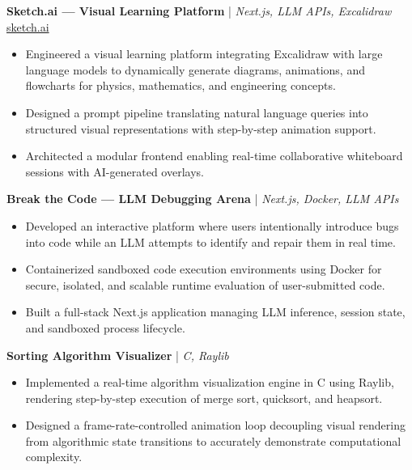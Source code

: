 \documentclass[a4paper,10pt]{article}
\begin{document}
\textbf{Sketch.ai --- Visual Learning Platform} | \textit{Next.js, LLM APIs, Excalidraw}
\quad \href{https://sketch-ai-six.vercel.app/}{sketch.ai}

\begin{itemize}
    \item Engineered a visual learning platform integrating Excalidraw with large language models to dynamically generate diagrams, animations, and flowcharts for physics, mathematics, and engineering concepts.
    \item Designed a prompt pipeline translating natural language queries into structured visual representations with step-by-step animation support.
    \item Architected a modular frontend enabling real-time collaborative whiteboard sessions with AI-generated overlays.
\end{itemize}

\vspace{2pt}

\textbf{Break the Code --- LLM Debugging Arena} | \textit{Next.js, Docker, LLM APIs}

\begin{itemize}
    \item Developed an interactive platform where users intentionally introduce bugs into code while an LLM attempts to identify and repair them in real time.
    \item Containerized sandboxed code execution environments using Docker for secure, isolated, and scalable runtime evaluation of user-submitted code.
    \item Built a full-stack Next.js application managing LLM inference, session state, and sandboxed process lifecycle.
\end{itemize}

\vspace{2pt}

\textbf{Sorting Algorithm Visualizer} | \textit{C, Raylib}

\begin{itemize}
    \item Implemented a real-time algorithm visualization engine in C using Raylib, rendering step-by-step execution of merge sort, quicksort, and heapsort.
    \item Designed a frame-rate-controlled animation loop decoupling visual rendering from algorithmic state transitions to accurately demonstrate computational complexity.
\end{itemize}
\end{document}
